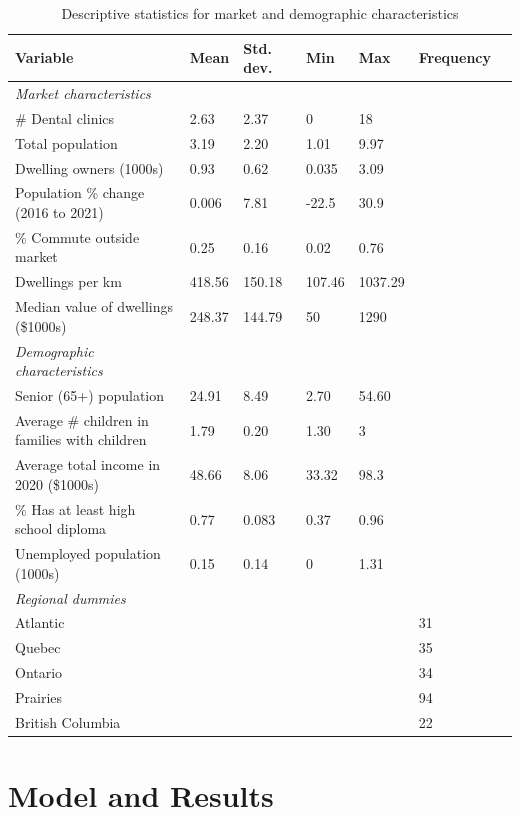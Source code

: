 \documentclass[a4paper,11pt]{article}
\begin{document}
\begin{table}[ht]
\centering
\caption{Descriptive statistics for market and demographic characteristics}
\label{table1}
\begin{tabular}{@{}lllllll@{}}
\toprule
Variable & Mean & Std. dev. & Min & Max & Frequency \\ \midrule
\textit{Market characteristics} & & & & & \\
\# Dental clinics & 2.63 & 2.37 & 0 & 18 &  \\
Total population & 3.19 & 2.20 & 1.01 & 9.97 & \\
Dwelling owners (1000s) & 0.93 & 0.62 & 0.035 & 3.09 & \\
Population \% change (2016 to 2021) & 0.006 &	7.81 & -22.5 & 30.9 & \\
\% Commute outside market & 0.25 & 0.16 & 0.02 & 0.76 & \\
Dwellings per km & 418.56 &	150.18 & 107.46 & 1037.29 & \\
Median value of dwellings (\$1000s) & 248.37 & 144.79 &	50 & 1290 & \\ 
\textit{Demographic characteristics} & & & & & \\
Senior (65+) population & 24.91 & 8.49 & 2.70 & 54.60 & \\
Average \# children in families with children & 1.79 & 0.20 & 1.30 & 3 & \\
Average total income in 2020 (\$1000s) & 48.66 & 8.06 & 33.32 & 98.3 & \\
\% Has at least high school diploma & 0.77 & 0.083 & 0.37 &	0.96 & \\
Unemployed population (1000s) & 0.15 & 0.14 & 0 & 1.31 & \\
\textit{Regional dummies} & & & & & \\
Atlantic & & & & & 31 \\
Quebec & & & & & 35 \\
Ontario & & & & & 34 \\
Prairies & & & & & 94 \\
British Columbia & & & & & 22 \\ \bottomrule
\end{tabular}
\end{table}

\section{Model and Results}
\end{document}
